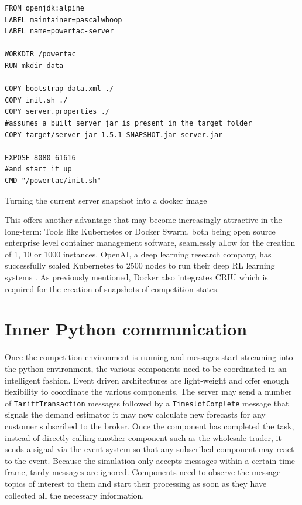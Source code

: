 \begin{listing}[h]

    \begin{verbatim}
FROM openjdk:alpine
LABEL maintainer=pascalwhoop
LABEL name=powertac-server

WORKDIR /powertac
RUN mkdir data

COPY bootstrap-data.xml ./
COPY init.sh ./
COPY server.properties ./
#assumes a built server jar is present in the target folder
COPY target/server-jar-1.5.1-SNAPSHOT.jar server.jar

EXPOSE 8080 61616
#and start it up
CMD "/powertac/init.sh"
    \end{verbatim}
    \caption{Turning the current server snapshot into a docker image}
    \label{lst:servertodocker}
\end{listing}

This offers another advantage that may become increasingly attractive in the long-term: Tools like Kubernetes or Docker Swarm, both being open source enterprise level container management
software, seamlessly allow for the creation of 1, 10 or 1000 instances. OpenAI, a deep learning research company, has
successfully scaled Kubernetes to 2500 nodes to run their deep \ac{RL} learning systems \citep{openai2500}. As
previously mentioned, Docker also integrates \ac{CRIU} which is required for the creation of snapshots of competition
states.


\section{Inner Python communication}%
\label{sub:inner_python_communication}

Once the competition environment is running and messages start streaming into the python environment, the various
components need to be coordinated in an intelligent fashion. Event driven architectures are light-weight and offer
enough flexibility to coordinate the various components. The server may send a number of \texttt{TariffTransaction}
messages followed by a \texttt{TimeslotComplete} message that signals the demand estimator it may now calculate new
forecasts for any customer subscribed to the broker. Once the component has completed the task, instead of directly
calling another component such as the wholesale trader, it sends a signal via the event system so that any subscribed
component may react to the event. Because the simulation only accepts messages within a certain time-frame, tardy
messages are ignored. Components need to observe the message topics of interest to them and start their processing as
soon as they have collected all the necessary information.


